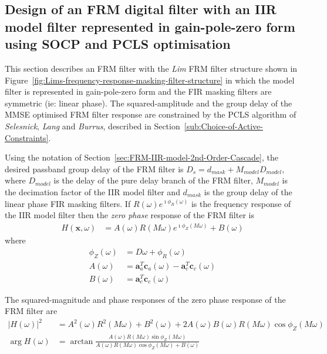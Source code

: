 \documentclass[a4paper,twoside,10pt,english]{report}
\begin{document}
\subsection{Design of  an FRM digital filter with an IIR model filter represented in gain-pole-zero form using SOCP and PCLS optimisation}
This section describes an FRM filter with the \emph{Lim} FRM filter structure
shown in Figure~\ref{fig:Lims-frequency-response-masking-filter-structure} in
which the model filter is represented in gain-pole-zero form and the FIR masking
filters are symmetric (ie: linear phase). The squared-amplitude and the group 
delay of the MMSE optimised FRM filter response are constrained by the PCLS 
algorithm of \emph{Selesnick}, \emph{Lang} and \emph{Burrus}, described in 
Section~\ref{sub:Choice-of-Active-Constraints}. 

Using the notation of Section~\ref{sec:FRM-IIR-model-2nd-Order-Cascade}, the
desired passband group delay of the FRM filter is 
$D_{s}=d_{mask}+M_{model}D_{model}$, where $D_{model}$ is the delay of the pure delay
branch of the FRM filter, $M_{model}$ is the decimation factor
of the IIR model filter and $d_{mask}$ is the group delay of the linear phase 
FIR masking filters. If $R\left(\omega\right)e^{\imath\phi_{R}\left(\omega\right)}$ 
is the frequency response of the IIR model filter then the \emph{zero phase} 
response of the FRM filter is 
\begin{align*}
H\left(\boldsymbol{x},\omega\right) &= 
A\left(\omega\right)R\left(M\omega\right)e^{\imath \phi_{Z}\left(M\omega\right)}
+ B\left(\omega\right)
\end{align*}
where
\begin{align*}
\phi_{Z}\left(\omega\right)&= D\omega + \phi_{R}\left(\omega\right)\\
A\left(\omega\right) &=
\boldsymbol{a}_{a}^{T}\boldsymbol{c}_{a}\left(\omega\right)-
\boldsymbol{a}_{c}^{T}\boldsymbol{c}_{c}\left(\omega\right) \\
B\left(\omega\right) &=
\boldsymbol{a}_{c}^{T}\boldsymbol{c}_{c}\left(\omega\right)
\end{align*}

The squared-magnitude and phase responses of the zero phase response of the 
FRM filter are
\begin{align*}
\left|H\left(\omega\right)\right|^{2}&=
A^{2}\left(\omega\right)R^{2}\left(M\omega\right)+B^{2}\left(\omega\right) +
2A\left(\omega\right)B\left(\omega\right)
R\left(M\omega\right)\cos\phi_{Z}\left(M\omega\right)\\
\arg H\left(\omega\right) &= \arctan 
\frac{A\left(\omega\right)R\left(M\omega\right)\sin\phi_{Z}\left(M\omega\right)}
{A\left(\omega\right)R\left(M\omega\right)\cos\phi_{Z}\left(M\omega\right) + 
B\left(\omega\right)}
\end{align*}
\end{document}
